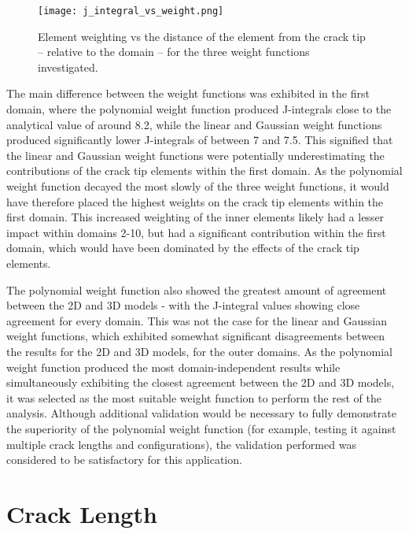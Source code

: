 \begin{figure}[H]
	\centering
	\texttt{[image: j\_integral\_vs\_weight.png]}
	\caption{Element weighting vs the distance of the element from the crack tip -- relative to the domain -- for the three weight functions investigated.}
	\label{fig:j_integral_vs_weight}
\end{figure}

The main difference between the weight functions was exhibited in the first domain, where the polynomial weight function produced J-integrals close to the analytical value of around 8.2, while the linear and Gaussian weight functions produced significantly lower J-integrals of between 7 and 7.5. This signified that the linear and Gaussian weight functions were potentially underestimating the contributions of the crack tip elements within the first domain. As the polynomial weight function decayed the most slowly of the three weight functions, it would have therefore placed the highest weights on the crack tip elements within the first domain. This increased weighting of the inner elements likely had a lesser impact within domains 2-10, but had a significant contribution within the first domain, which would have been dominated by the effects of the crack tip elements.

The polynomial weight function also showed the greatest amount of agreement between the 2D and 3D models - with the J-integral values showing close agreement for every domain. This was not the case for the linear and Gaussian weight functions, which exhibited somewhat significant disagreements between the results for the 2D and 3D models, for the outer domains. As the polynomial weight function produced the most domain-independent results while simultaneously exhibiting the closest agreement between the 2D and 3D models, it was selected as the most suitable weight function to perform the rest of the analysis. Although additional validation would be necessary to fully demonstrate the superiority of the polynomial weight function (for example, testing it against multiple crack lengths and configurations), the validation performed was considered to be satisfactory for this application.

\section{Crack Length}

